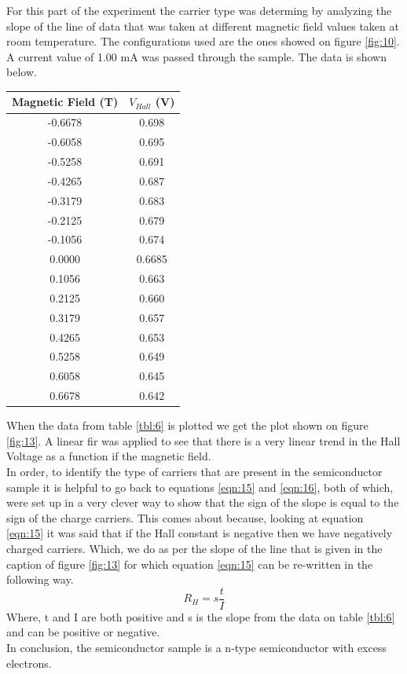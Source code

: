\documentclass[twocolumn]{article}
\begin{document}
For this part of the experiment the carrier type was determing by analyzing the 
slope of the line of data that was taken at different magnetic field values 
taken at room temperature. The configurations used are the ones showed on 
figure \ref{fig:10}. A current value of 1.00 mA was passed through the 
sample. The data is shown below.
\begin{minipage}{\linewidth}
\Centering
\begin{tabular}{|c|c|}
\hline
Magnetic Field (T) & $V_{Hall}$ (V) \\ \hline
-0.6678 & 0.698 \\ \hline
-0.6058 & 0.695 \\ \hline
-0.5258 & 0.691 \\ \hline
-0.4265 & 0.687 \\ \hline
-0.3179 & 0.683 \\ \hline
-0.2125 & 0.679 \\ \hline
-0.1056 & 0.674 \\ \hline
0.0000 & 0.6685 \\ \hline
0.1056 & 0.663 \\ \hline
0.2125 & 0.660 \\ \hline
0.3179 & 0.657 \\ \hline
0.4265 & 0.653 \\ \hline
0.5258 & 0.649 \\ \hline
0.6058 & 0.645 \\ \hline
0.6678 & 0.642 \\ \hline
\end{tabular}
\label{tbl:6}
\end{minipage}
When the data from table \ref{tbl:6} is plotted we get the plot shown on figure 
\ref{fig:13}. A linear fir was applied to see that there is a very linear trend 
in the Hall Voltage as a function if the magnetic field.
\\
In order, to identify the type of carriers that are present in the 
semiconductor sample it is helpful to go back to equations \ref{eqn:15} and 
\ref{eqn:16}, both of which, were set up in a very clever way to show that the 
sign of the slope is equal to the sign of the charge carriers. This comes about 
because, looking at equation \ref{eqn:15} it was said that if the Hall constant 
is negative then we have negatively charged carriers. Which, we do as per the 
slope of the line that is given in the caption of figure \ref{fig:13} for which 
equation \ref{eqn:15} can be re-written in the following way. 
\begin{equation}
R_{H} = s\frac{t}{I}
\label{eqn:18}
\end{equation}
Where, t and I are both positive and s is the slope from the data on table 
\ref{tbl:6} and can be positive or negative.
\\
In conclusion, 
the semiconductor sample is a n-type semiconductor with excess electrons.
\end{document}
